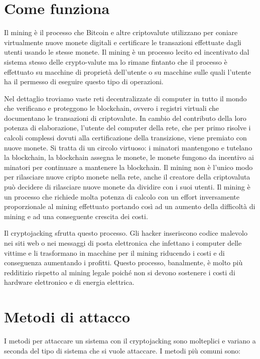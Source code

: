 \documentclass[12pt,a4paper]{article}
\begin{document}
\newpage

\section{Come funziona}
Il mining è il processo che Bitcoin e altre criptovalute utilizzano per coniare
virtualmente nuove monete digitali e certificare le transazioni effettuate dagli
utenti usando le stesse monete. Il mining è un processo lecito ed incentivato dal sistema stesso delle crypto-valute ma lo rimane fintanto che il processo è effettuato su macchine di proprietà dell'utente o su macchine sulle quali l'utente ha il permesso di eseguire questo tipo di operazioni.

Nel dettaglio troviamo vaste reti decentralizzate di computer in tutto il mondo
che verificano e proteggono le blockchain, ovvero i registri virtuali che
documentano le transazioni di criptovalute. In cambio del contributo della loro
potenza di elaborazione, l'utente del computer della rete, che per primo risolve
i calcoli complessi dovuti alla certificazione della transizione, viene premiato
con nuove monete. Si tratta di un circolo virtuoso: i minatori mantengono e
tutelano la blockchain, la blockchain assegna le monete, le monete fungono da
incentivo ai minatori per continuare a mantenere la blockchain. Il mining non è
l'unico modo per rilasciare nuove cripto monete nella rete, anche il creatore
della criptovaluta può decidere di rilasciare nuove monete da dividire con i
suoi utenti. Il mining è un processo che richiede molta potenza di calcolo con
un effort inversamente proporzionale al mining effettuato portando così ad un
aumento della difficoltà di mining e ad una conseguente crescita dei costi.

Il cryptojacking sfrutta questo processo. Gli hacker inseriscono codice malevolo
nei siti web o nei messaggi di posta elettronica che infettano i computer delle
vittime e li trasformano in macchine per il mining riducendo i costi e di conseguenza aumentando i profitti. Questo processo, banalmente, è molto più redditizio rispetto al mining legale poiché non si devono sostenere i costi di hardware elettronico e di energia elettrica.

\newpage

\section{Metodi di attacco}
I metodi per attaccare un sistema con il cryptojacking sono molteplici e variano
a seconda del tipo di sistema che si vuole attaccare. I metodi più comuni sono:
\end{document}
